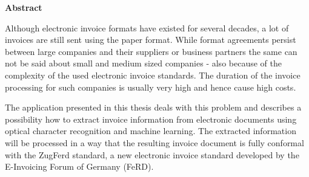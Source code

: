 \documentclass[english,mt]{lmedoc}
\begin{document}
\vspace{5.0cm}

\begin{center}
\bfseries
Abstract
\normalfont

Although electronic invoice formats have existed for several decades, a lot of invoices are still sent using the paper format. While format agreements persist between large companies and their suppliers or business partners the same can not be said about small and medium sized companies - also because of the complexity of the used electronic invoice standards.
The duration of the invoice processing for such companies is usually very high and hence cause high costs.

The application presented in this thesis deals with this problem and describes a possibility how to extract invoice information from electronic documents using optical character recognition and machine learning. The extracted information will be processed in a way that the resulting invoice document is fully conformal with the ZugFerd standard, a new electronic invoice standard developed by the E-Invoicing Forum of Germany (FeRD). 
\end{center}

\cleardoublepage

\tableofcontents

\cleardoublepage {}
\end{document}
